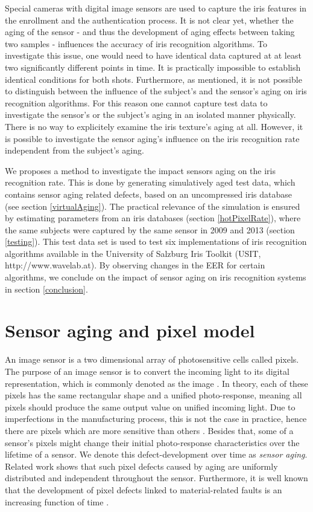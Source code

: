 \documentclass[10pt,twocolumn,letterpaper]{article}
\begin{document}
Special cameras with digital image sensors are used to capture the iris features in the enrollment and the authentication process. It is not clear yet, whether the aging of the sensor - and thus the development of aging effects between taking two samples - influences the accuracy of iris recognition algorithms. To investigate this issue, one would need to have identical data captured at at least two significantly different points in time. It is practically impossible to establish identical conditions for both shots. Furthermore, as mentioned, it is not possible to distinguish between the influence of the subject's and the sensor's aging on iris recognition algorithms. For this reason one cannot capture test data to investigate the sensor's or the subject's aging in an isolated manner physically. There is no way to explicitely examine the iris texture's aging at all. However, it is possible to investigate the sensor aging's influence on the iris recognition rate independent from the subject's aging.

We proposes a method to investigate the impact sensors aging on the iris recognition rate. This is done by generating simulatively aged test data, which contains sensor aging related defects, based on an uncompressed iris database (see section \ref{virtualAging}). The practical relevance of the simulation is ensured by estimating parameters from an iris databases (section \ref{hotPixelRate}), where the same subjects were captured by the same sensor in 2009 and 2013 (section \ref{testing}). This test data set is used to test six implementations of iris recognition algorithms available in the University of Salzburg Iris Toolkit (USIT, http://www.wavelab.at). By observing changes in the EER for certain algorithms, we conclude on the impact of sensor aging on iris recognition systems in section \ref{conclusion}.


\section{Sensor aging and pixel model}
\label{sec:agingAndPixelModel}
An image sensor is a two dimensional array of photosensitive cells called pixels. The purpose of an image sensor is to convert the incoming light to its digital representation, which is commonly denoted as the image \cite{imageSensors}. In theory, each of these pixels has the same rectangular shape and a unified photo-response, meaning all pixels should produce the same output value on unified incoming light. Due to imperfections in the manufacturing process, this is not the case in practice, hence there are pixels which are more sensitive than others \cite{camAndDisplays}. Besides that, some of a sensor's pixels might change their initial photo-response characteristics over the lifetime of a sensor. We denote this defect-development over time as \emph{sensor aging}.
Related work shows that such pixel defects caused by aging are uniformly distributed and independent throughout the sensor. Furthermore, it is well known that the development of pixel defects linked to material-related faults is an increasing function of time \cite{datingImages, inFieldDefects, defectDetection,failureSemi, defectIdentification, fridrich}.
\end{document}
